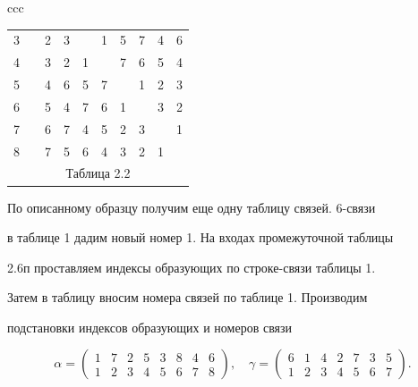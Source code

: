 \begin{center}
\begin{tabular}{ccc}
\begin{tabular}{cccccccccc}
3 & \vline & 2 & 3 & \ & 1 & 5 & 7 & 4 & 6 \\


4 & \vline & 3 & 2 & 1 & \ & 7 & 6 & 5 & 4 \\


5 & \vline & 4 & 6 & 5 & 7 & \ & 1 & 2 & 3 \\


6 & \vline & 5 & 4 & 7 & 6 & 1 & \ & 3 & 2 \\


7 & \vline & 6 & 7 & 4 & 5 & 2 & 3 & \ & 1 \\


8 & \vline & 7 & 5 & 6 & 4 & 3 & 2 & 1 & \ \\


\multicolumn{10}{c}{ Таблица 2.2}


\end{tabular}





\end{tabular}


\end{center}


\smallskip





По описанному образцу получим еще одну таблицу связей. 6-связи


в таблице 1 дадим новый номер 1. На входах промежуточной таблицы


2.6п проставляем индексы образующих по строке-связи таблицы 1.


Затем в таблицу вносим номера связей по таблице 1. Производим


подстановки индексов образующих и номеров связи


$$


\alpha=\begin{pmatrix} 1 & 7 & 2 & 5 & 3 & 8 & 4 & 6 \\


1 & 2 & 3 & 4 & 5 & 6 & 7 & 8 \end{pmatrix},\quad


\gamma=\begin{pmatrix} 6 & 1 & 4 & 2 & 7 & 3 & 5 \\


1 & 2 & 3 & 4 & 5 & 6 & 7 \end{pmatrix}.


$$


